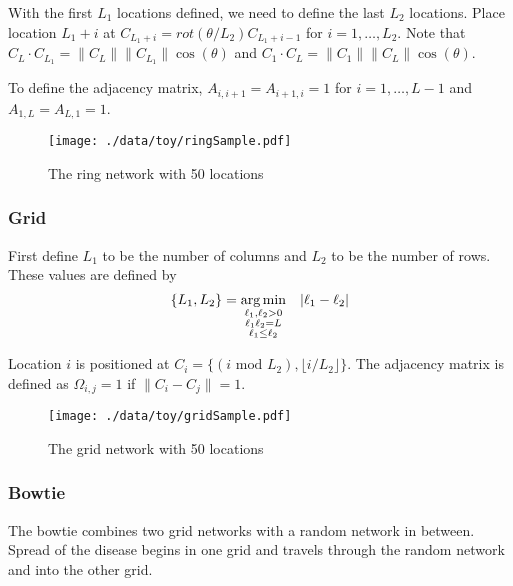 \documentclass[11pt]{article}
\begin{document}
With the first $L_1$ locations defined, we need to define the last
$L_2$ locations.  Place location $L_1 + i$ at $C_{L_1 + i} =
    rot(\theta/L_2)C_{L_1 + i - 1}$ for $i = 1,\ldots,L_2$.  Note that
$C_{L} \cdot C_{L_1} = \|C_{L}\| \|C_{L_1}\| \cos(\theta)$ and $C_{1}
    \cdot C_{L} = \|C_{1}\| \|C_{L}\| \cos(\theta)$.

To define the adjacency matrix, $A_{i,i+1} = A_{i+1,i} = 1$ for $i =
    1,\ldots,L-1$ and $A_{1,L} = A_{L,1} = 1$.



\begin{figure}[htb]
\centering
\texttt{[image: ./data/toy/ringSample.pdf]}
\caption{\label{fig:ring50}The ring network with 50 locations}
\end{figure}




\subsubsection{Grid}
\label{sec-3-1-4}

First define $L_1$ to be the number of columns and $L_2$ to be the
number of rows.  These values are defined by
\begin{equation*}
\lbrace L_1, L_2 \rbrace = \underset{
\begin{subarray}{c}
\ell_1,\ell_2 > 0\\
\ell_1\ell_2 = L\\
\ell_1 \le \ell_2
\end{subarray}
}{\arg\min} \quad |\ell_1 - \ell_2|
\end{equation*}

Location $i$ is positioned at $C_i = \lbrace (i \text{ mod } L_2), \lfloor
    i/L_2 \rfloor \rbrace$.  The adjacency matrix is defined as $\Omega_{i,j} =
    1$ if $\|C_i - C_j\| = 1$.

\begin{figure}[htb]
\centering
\texttt{[image: ./data/toy/gridSample.pdf]}
\caption{\label{fig:grid50}The grid network with 50 locations}
\end{figure}



\subsubsection{Bowtie}
\label{sec-3-1-5}

The bowtie combines two grid networks with a random network in
between.  Spread of the disease begins in one grid and travels through
the random network and into the other grid.
\end{document}

